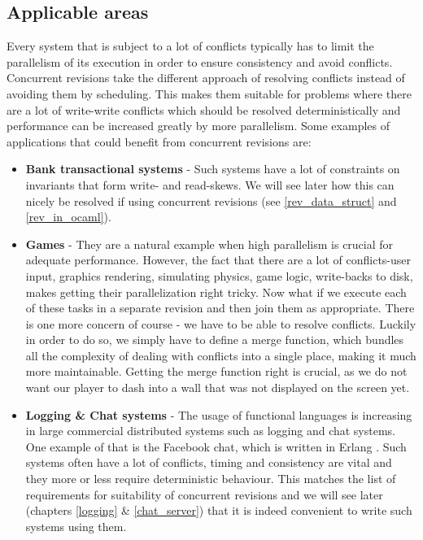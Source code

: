 \documentclass[12pt,twoside,notitlepage]{report}
\begin{document}
\subsection{Applicable areas}
Every system that is subject to a lot of conflicts typically has to limit the parallelism of its execution in order to ensure consistency and avoid conflicts. Concurrent revisions take the different approach of resolving conflicts instead of avoiding them by scheduling. This makes them suitable for problems where there are a lot of write-write conflicts which should be resolved deterministically and performance can be increased greatly by more parallelism. Some examples of applications that could benefit from concurrent revisions are: 

\begin{itemize}


\item
{\bfseries Bank transactional systems} - Such systems have a lot of constraints on invariants that form write- and read-skews. We will see later how this can nicely be resolved if using concurrent revisions (see \ref{rev_data_struct} and \ref{rev_in_ocaml}). 

\item
{\bfseries Games} - They are a natural example when high parallelism is crucial for adequate performance. However, the fact that there are a lot of conflicts-user input, graphics rendering, simulating physics, game logic, write-backs to disk, makes getting their parallelization right tricky. Now what if we execute each of these tasks in a separate revision and then join them as appropriate. There is one more concern of course - we have to be able to resolve conflicts. Luckily in order to do so, we simply have to define a merge function, which bundles all the complexity of dealing with conflicts into a single place, making it much more maintainable. Getting the merge function right is crucial, as we do not want our player to dash into a wall that was not displayed on the screen yet.

\item
{\bfseries Logging \& Chat systems} - The usage of functional languages is increasing in large commercial distributed systems such as logging and chat systems. One example of that is the Facebook chat, which is written in Erlang \cite{erlang}. Such systems often have a lot of conflicts, timing and consistency are vital and they more or less require deterministic behaviour. This matches the list of requirements for suitability of concurrent revisions and we will see later (chapters \ref{logging} \& \ref{chat_server}) that it is indeed convenient to write such systems using them. 

\end{itemize}
\end{document}
